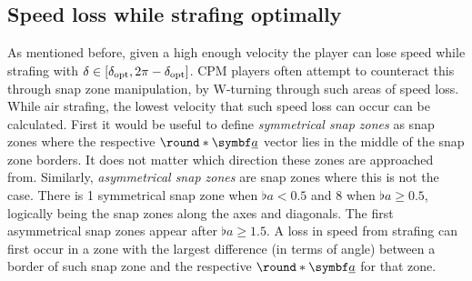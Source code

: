 \subsection{Speed loss while strafing optimally}
\label{sec:speed_loss_while_strafing}
As mentioned before, given a high enough velocity the player can lose speed while strafing with $\delta \in [\delta_{\operatorname{opt}}, 2\pi - \delta_{\operatorname{opt}}]$. CPM players often attempt to counteract this through snap zone manipulation, by W-turning through such areas of speed loss.\\

While air strafing, the lowest velocity that such speed loss can occur can be calculated. First it would be useful to define \emph{symmetrical snap zones} as snap zones where the respective $\round*{\vec{\flat{a}}}$ vector lies in the middle of the snap zone borders. It does not matter which direction these zones are approached from. Similarly, \emph{asymmetrical snap zones} are snap zones where this is not the case.
There is 1 symmetrical snap zone when $\flat{a} < 0.5$ and 8 when $\flat{a}\ge 0.5$, logically being the snap zones along the axes and diagonals. The first asymmetrical snap zones appear after $\flat{a}\ge 1.5$.
A loss in speed from strafing can first occur in a zone with the largest difference (in terms of angle) between a border of such snap zone and the respective $\round*{\vec{\flat{a}}}$ for that zone.\\

